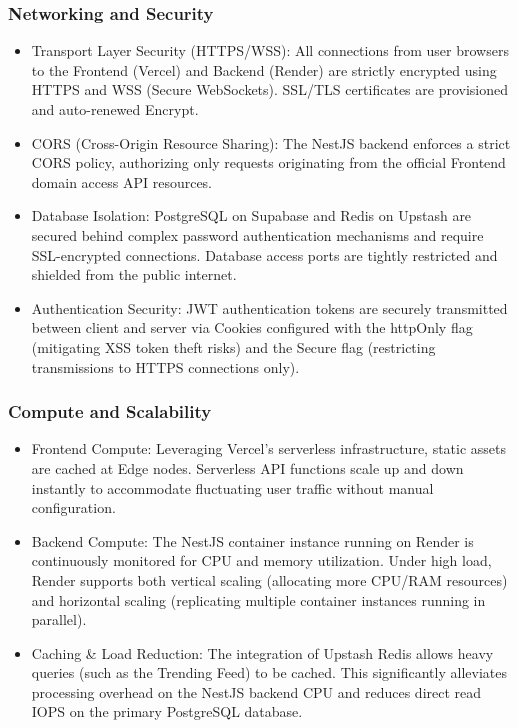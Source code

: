 \subsubsection{Networking and Security}
\begin{itemize}
  \item Transport Layer Security (HTTPS/WSS): All connections from user browsers to the Frontend (Vercel) and Backend (Render) are strictly encrypted using HTTPS and WSS (Secure WebSockets). SSL/TLS certificates are provisioned and auto-renewed Encrypt.
  \item CORS (Cross-Origin Resource Sharing): The NestJS backend enforces a strict CORS policy, authorizing only requests originating from the official Frontend domain access API resources.
  \item Database Isolation: PostgreSQL on Supabase and Redis on Upstash are secured behind complex password authentication mechanisms and require SSL-encrypted connections. Database access ports are tightly restricted and shielded from the public internet.
  \item Authentication Security: JWT authentication tokens are securely transmitted between client and server via Cookies configured with the httpOnly flag (mitigating XSS token theft risks) and the Secure flag (restricting transmissions to HTTPS connections only).
\end{itemize}

\subsubsection{Compute and Scalability}
\begin{itemize}
  \item Frontend Compute: Leveraging Vercel's serverless infrastructure, static assets are cached at Edge nodes. Serverless API functions scale up and down instantly to accommodate fluctuating user traffic without manual configuration.
  \item Backend Compute: The NestJS container instance running on Render is continuously monitored for CPU and memory utilization. Under high load, Render supports both vertical scaling (allocating more CPU/RAM resources) and horizontal scaling (replicating multiple container instances running in parallel).
  \item Caching \& Load Reduction: The integration of Upstash Redis allows heavy queries (such as the Trending Feed) to be cached. This significantly alleviates processing overhead on the NestJS backend CPU and reduces direct read IOPS on the primary PostgreSQL database.
\end{itemize}

